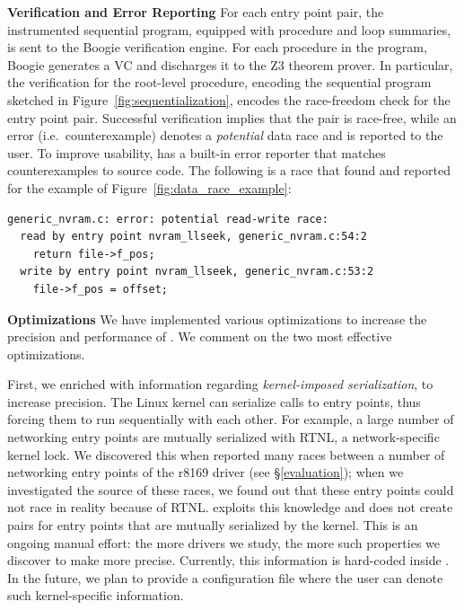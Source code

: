 \noindent\textbf{Verification and Error Reporting }
%
For each entry point pair, the instrumented sequential program, equipped with procedure and loop summaries, is sent to the Boogie verification engine. For each procedure in the program, Boogie generates a VC and discharges it to the Z3 theorem prover.  In particular, the verification for the root-level procedure, encoding the sequential program sketched in Figure~\ref{fig:sequentialization}, encodes the race-freedom check for the entry point pair. Successful verification implies that the pair is race-free, while an error (i.e.\ counterexample) denotes a \emph{potential} data race and is reported to the user. To improve usability, \whoop has a built-in error reporter that matches counterexamples to source code. The following is a race that \whoop found and reported for the example of Figure~\ref{fig:data_race_example}: 

\begin{lstlisting}[keywordstyle=\ttfamily]
generic_nvram.c: error: potential read-write race:
  read by entry point nvram_llseek, generic_nvram.c:54:2
    return file->f_pos;
  write by entry point nvram_llseek, generic_nvram.c:53:2
    file->f_pos = offset;
\end{lstlisting}

\noindent\textbf{Optimizations }
%
We have implemented various optimizations to increase the precision and performance of \whoop.  We comment on the two most effective optimizations.

First, we enriched \whoop with information regarding \emph{kernel-imposed serialization}, to increase precision. The Linux kernel can serialize calls to entry points, thus forcing them to run sequentially with each other. For example, a large number of networking entry points are mutually serialized with RTNL, a network-specific kernel lock. We discovered this when \whoop reported many races between a number of networking entry points of the r8169 driver (see \S\ref{evaluation}); when we investigated the source of these races, we found out that these entry points could not race in reality because of RTNL. \whoop exploits this knowledge and does not create pairs for entry points that are mutually serialized by the kernel. This is an ongoing manual effort: the more drivers we study, the more such properties we discover to make \whoop more precise. Currently, this information is hard-coded inside \whoop. In the future, we plan to provide a configuration file where the user can denote such kernel-specific information.

